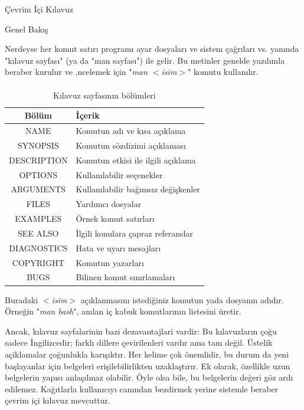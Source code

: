 \begin{section}{Çevrim İçi Kılavuz}
\begin{subsection}{Genel Bakış}

Nerdeyse her komut satırı programı ayar dosyaları ve sistem çağrıları vs. yanında "kılavuz sayfası" (ya da "man sayfası") ile gelir. Bu metinler genelde yazılımla beraber kurulur ve ,ncelemek için "\emph{man $<$isim$>$}" komutu kullanılır.

\paragraph{}{
\begin {table}[H]
\caption {Kılavuz sayfasının bölümleri} \label{tab:title} 
\begin{tabular}{c l}
\hline
Bölüm & İçerik \\
\hline
NAME 	&	Komutun adı ve kısa açıklama \\
SYNOPSIS &	Komutun sözdizimi açıklaması \\
DESCRIPTION &	Komutun etkisi ile ilgili açıklama \\
OPTIONS &	Kullanılabilir seçenekler \\
ARGUMENTS &	Kullanılabilir bağımsız değişkenler \\
FILES 	&	Yardımcı dosyalar \\
EXAMPLES &	Örnek komut satırları \\
SEE ALSO &	İlgili konulara çapraz referanslar \\
DIAGNOSTICS &	Hata ve uyarı mesajları \\
COPYRIGHT & 	Komutun yazarları \\
BUGS	&	Bilinen komut sınırlamaları \\
\hline
\end{tabular}
\end {table}
}

Buradaki \emph{$<$isim$>$} açıklanmasını istediğiniz komutun yada dosyanın adıdır. Örneğin "\emph{man bash}", anılan iç kabuk komutlarının listesini üretir.

Ancak, kılavuz sayfalarinin bazi dezavantajlari vardir: Bu kılavuzların çoğu sadece İngilizcedir; farklı dillere çevirilenleri vardır ama tam değil. Üstelik açiklamalar çoğunlukla karışıktır. Her kelime çok önemlidir, bu durum da yeni başlayanlar için belgeleri erişilebilirlikten uzaklaştırır. Ek olarak, özellikle uzun belgelerin yapısı anlaşılmaz olabilir. Öyle olsa bile, bu belgelerin değeri göz ardı edilemez. Kağıtlarla kullanıcıyı canından bezdirmek yerine sistemle beraber çevrim içi kılavuz mevcuttur.


\end{subsection}
\end{section}
